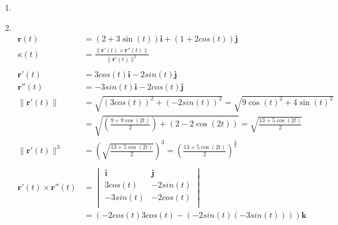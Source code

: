 \documentclass[11pt]{article}
\newcommand\Item[1][]{%
  \ifx\relax#1\relax  \item \else \item[#1] \fi
  \abovedisplayskip=0pt\abovedisplayshortskip=0pt~\vspace*{-\baselineskip}}
\begin{document}
\begin{enumerate}
\begin{enumerate}
              \Item\\
              \begin{align*}
                  \textbf{r}(t)                               & =(2+3\sin(t))\textbf{i}+(1+2cos(t))\textbf{j}                                                                                         \\
                  \kappa(t)                                   & = \frac{\| \textbf{r}'(t) \times \textbf{r}''(t) \|}{\| \textbf{r}'(t) \|^3}                                                          \\\\
                  \textbf{r}'(t)                              & = 3cos(t)\textbf{i} - 2sin(t)\textbf{j}                                                                                               \\
                  \textbf{r}''(t)                             & = -3sin(t)\textbf{i} - 2cos(t)\textbf{j}                                                                                              \\
                  \| \textbf{r}'(t) \|                        & = \sqrt{(3cos(t))^{2}+(-2sin(t))^{2}}    = \sqrt{9\cos\left(t\right)^{2}+4\sin\left(t\right)^{2}}                                     \\
                                                              & = \sqrt{\left(\frac{9+9\cos\left(2t\right)}{2}\right)+\left(2-2\cos\left(2t\right)\right)} = \sqrt{\frac{13+5\cos\left(2t\right)}{2}} \\
                  \| \textbf{r}'(t) \|^{3}                    & = \left(\sqrt{\frac{13+5\cos\left(2t\right)}{2}}\right)^{3} = \left(\frac{13+5\cos\left(2t\right)}{2}\right)^{\frac{3}{2}}            \\
                  \\\textbf{r}'(t)\times\textbf{r}''(t)         & =
                  \begin{vmatrix}
                      \textbf{i} & \textbf{j} \\
                      3cos(t)    & -2sin(t)   \\
                      -3sin(t)   & -2cos(t)   \\
                  \end{vmatrix}                                                                                                                                                          \\
                                                              & = (-2cos(t)3cos(t) - (-2sin(t)(-3sin(t))))\textbf{k}                                                                                  \\

\end{align*}
\end{enumerate}
\end{enumerate}
\end{document}
